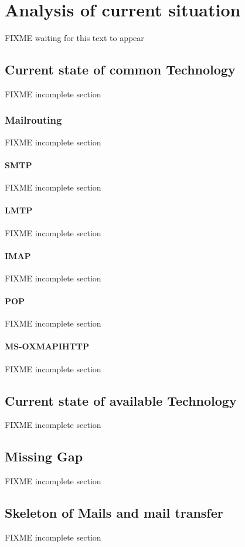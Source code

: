 \chapter{Analysis of current situation}\label{chap:analysis}
FIXME waiting for this text to appear

\section{Current state of common Technology}
FIXME incomplete section

\subsection{Mailrouting}
FIXME incomplete section

\subsubsection{SMTP}
FIXME incomplete section

\subsubsection{LMTP}
FIXME incomplete section

\subsubsection{IMAP}
FIXME incomplete section

\subsubsection{POP}
FIXME incomplete section

\subsubsection{MS-OXMAPIHTTP}
FIXME incomplete section

\section{Current state of available Technology}
FIXME incomplete section

\section{Missing Gap}
FIXME incomplete section

\section{Skeleton of Mails and mail transfer}
FIXME incomplete section


